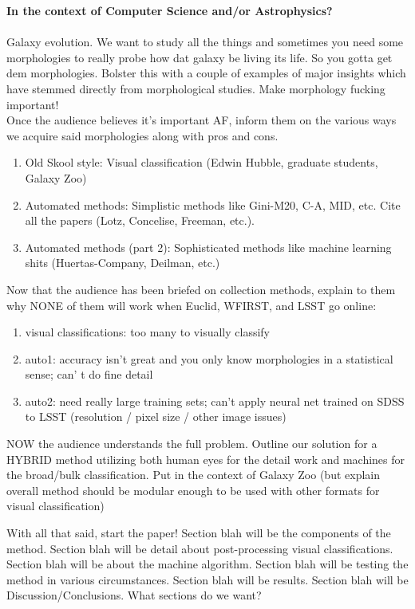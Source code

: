 \documentclass[twocolumn]{aastex6}
\begin{document}
\textbf{In the context of Computer Science and/or Astrophysics?} \\
\\
Galaxy evolution. We want to study all the things and sometimes you need some morphologies to really probe how dat galaxy be living its life. So you gotta get dem morphologies. Bolster this with a couple of examples of major insights which have stemmed directly from morphological studies. Make morphology fucking important!\\
Once the audience believes it's important AF, inform them on the various ways we acquire said morphologies along with pros and cons.\\
\begin{enumerate}
\item Old Skool style: Visual classification (Edwin Hubble, graduate students, Galaxy Zoo) \\
\item Automated methods: Simplistic methods like Gini-M20, C-A, MID, etc. Cite all the papers (Lotz, Concelise, Freeman, etc.). \\
\item Automated methods (part 2): Sophisticated methods like machine learning shits (Huertas-Company, Deilman, etc.) \\
\end{enumerate}
Now that the audience has been briefed on collection methods, explain to them why NONE of them will work when Euclid, WFIRST, and LSST go online: 
\begin{enumerate}
\item visual classifications:  too many to visually classify 
\item auto1:  accuracy isn't great and you only know morphologies in a statistical sense; can' t do fine detail
\item auto2: need really large training sets; can't apply neural net trained on SDSS to LSST (resolution / pixel size / other image issues)
\end{enumerate}
NOW the audience understands the full problem. Outline our solution for a HYBRID method utilizing both human eyes for the detail work and machines for the broad/bulk classification. Put in the context of Galaxy Zoo (but explain overall method should be modular enough to be used with other formats for visual classification)

With all that said, start the paper! Section blah will be the components of the method. Section blah will be detail about post-processing visual classifications. Section blah will be about the machine algorithm. Section blah will be testing the method in various circumstances. Section blah will be results. Section blah will be Discussion/Conclusions. 
What sections do we want? 
\end{document}
